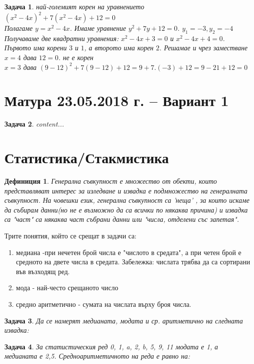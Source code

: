 \documentclass{article}
\newtheorem{definition}{Дефиниция}
\newtheorem{problem}{Задача}
\begin{document}
\begin{problem}
	най-големият корен на уравнението $(x^2-4x)^2+ 7(x^2-4x) + 12 =0$  \\
	Полагаме $y = x^2 - 4x $. Имаме уравнение $y^2+7y+12 = 0$. $y_1 = -3, y_2 = -4 $ Получаваме две квадратни уравнения:
	$x^2 - 4x + 3 = 0 $ и $x^2 - 4x + 4 = 0 $. Първото има корени  $3$ и $1$, а второто има корен $2$.
	Решамае и чрез заместване
	$x = 4 $ дава $12 = 0$. не е корен \\
	$x = 3$ дава $(9-12)^2 +7(9-12) + 12 = 9 + 7.(-3) + 12 = 9 - 21 + 12 = 0$
\end{problem}


\section{Матура 23.05.2018 г. – Вариант 1}
\begin{problem}
	content...
\end{problem}

\section{Статистика/Стакмистика}
\begin{definition}
	Генерална съвкупност е множество от обекти, които представляват интерес за изледване и извадка е подмножество на генералната съвкупност. На човешки език, генерална съвкупност са 'неща' , за които искаме да събирам данни(но не е възможно да са всички по някаква причина) и извадка са "част" са някаква част събрани данни или "числа, отделени със запетая". 
\end{definition} 

Трите понятия, който се срещат в задачи са:
\begin{enumerate}
	\item медиана -при нечетен брой числа е "числото в средата", а при четен брой е средното на двете числа в средата. Забележка: числата трябва да са сортирани във възходящ ред.
	\item мода - най-често срещаното число
	\item средно аритметично - сумата на числата върху броя числа.
\end{enumerate}

\begin{problem}
	Да се намерят медианата, модата и ср. аритметично на следната извадка:
\end{problem}

\begin{problem}
	За статистическия ред 0, 1, a, 2, b, 5, 9, 11 модата е 1, а медианата е 2,5.
	Средноаритметичното на реда е равно на:
\end{problem}
\end{document}
